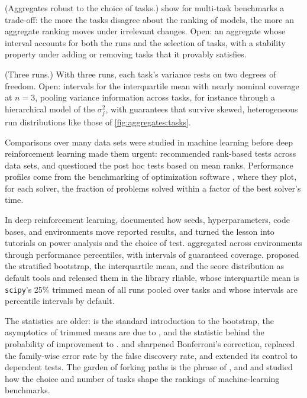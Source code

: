 \begin{refsection}
\begin{exercises}
\item \research (Aggregates robust to the choice of tasks.) \Textcite{ZhangHardt2024} show for multi-task benchmarks a trade-off: the more the tasks disagree about the ranking of models, the more an aggregate ranking moves under irrelevant changes. Open: an aggregate whose interval accounts for both the runs and the selection of tasks, with a stability property under adding or removing tasks that it provably satisfies.\label{ex:aggregates:robust}

\item \research (Three runs.) With three runs, each task's variance rests on two degrees of freedom. Open: intervals for the interquartile mean with nearly nominal coverage at $n=3$, pooling variance information across tasks, for instance through a hierarchical model of the $\sigma_j^2$, with guarantees that survive skewed, heterogeneous run distributions like those of \cref{fig:aggregates:tasks}.\label{ex:aggregates:threeruns}
\end{exercises}

\notesandrefs
Comparisons over many data sets were studied in machine learning before deep reinforcement learning made them urgent: \textcite{Demsar2006} recommended rank-based tests across data sets, and \textcite{BenavoliEtAl2016} questioned the post hoc tests based on mean ranks. Performance profiles come from the benchmarking of optimization software \parencite{DolanMore2002}, where they plot, for each solver, the fraction of problems solved within a factor of the best solver's time.

In deep reinforcement learning, \textcite{HendersonEtAl2018} documented how seeds, hyperparameters, code bases, and environments move reported results, and \textcite{ColasEtAl2018,ColasEtAl2019} turned the lesson into tutorials on power analysis and the choice of test. \Textcite{JordanEtAl2020} aggregated across environments through performance percentiles, with intervals of guaranteed coverage. \Textcite{AgarwalEtAl2021} proposed the stratified bootstrap, the interquartile mean, and the score distribution as default tools and released them in the library rliable, whose interquartile mean is \texttt{scipy}'s 25\% trimmed mean of all runs pooled over tasks and whose intervals are percentile intervals by default.

The statistics are older: \textcite{EfronTibshirani1993} is the standard introduction to the bootstrap, the asymptotics of trimmed means are due to \textcite{Stigler1973}, and the statistic behind the probability of improvement to \textcite{MannWhitney1947}. \Textcite{Sidak1967} and \textcite{Holm1979} sharpened Bonferroni's correction, \textcite{BenjaminiHochberg1995} replaced the family-wise error rate by the false discovery rate, and \textcite{BenjaminiYekutieli2001} extended its control to dependent tests. The garden of forking paths is the phrase of \textcite{GelmanLoken2013,GelmanLoken2014}, and \textcite{DehghaniEtAl2021} and \textcite{ZhangHardt2024} studied how the choice and number of tasks shape the rankings of machine-learning benchmarks.


\end{refsection}
